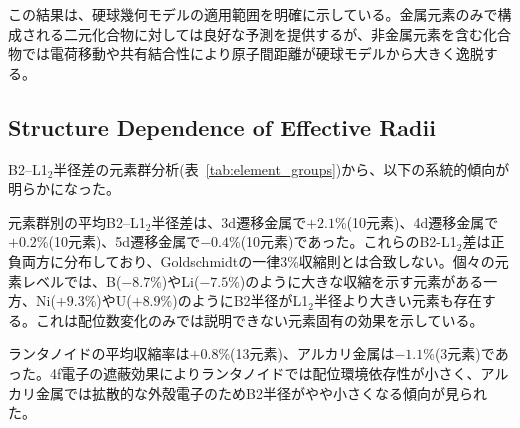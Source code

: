 \documentclass[a4paper,10pt,5p]{elsarticle}
\begin{document}

\begin{table}[htbp]
\small
    \centering
    \caption{Effect of non-metallic element exclusion on lattice constant prediction accuracy.}
    \label{tab:nonmetal_effect}
\end{table}

この結果は、硬球幾何モデルの適用範囲を明確に示している。金属元素のみで構成される二元化合物に対しては良好な予測を提供するが、非金属元素を含む化合物では電荷移動や共有結合性により原子間距離が硬球モデルから大きく逸脱する。

\subsection{Structure Dependence of Effective Radii}

B2--L1$_2$半径差の元素群分析(表~\ref{tab:element_groups})から、以下の系統的傾向が明らかになった。

元素群別の平均B2--L1$_2$半径差は、3d遷移金属で$+2.1$\%(10元素)、4d遷移金属で$+0.2$\%(10元素)、5d遷移金属で$-0.4$\%(10元素)であった。これらのB2-L1$_2$差は正負両方に分布しており、Goldschmidtの一律3\%収縮則とは合致しない。個々の元素レベルでは、B($-8.7$\%)やLi($-7.5$\%)のように大きな収縮を示す元素がある一方、Ni($+9.3$\%)やU($+8.9$\%)のようにB2半径がL1$_2$半径より大きい元素も存在する。これは配位数変化のみでは説明できない元素固有の効果を示している。

ランタノイドの平均収縮率は$+0.8$\%(13元素)、アルカリ金属は$-1.1$\%(3元素)であった。4f電子の遮蔽効果によりランタノイドでは配位環境依存性が小さく、アルカリ金属では拡散的な外殻電子のためB2半径がやや小さくなる傾向が見られた。
\end{document}
